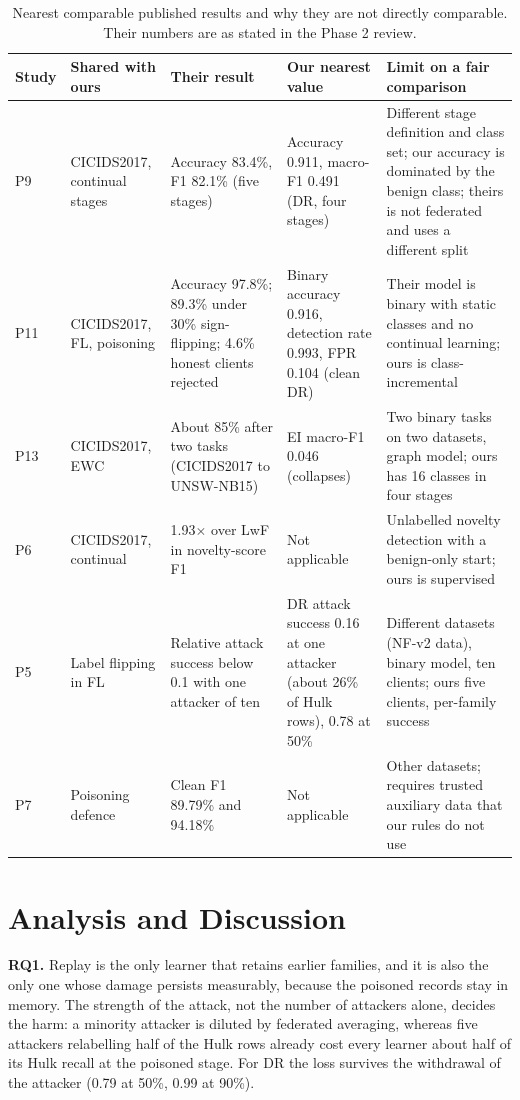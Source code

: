 \documentclass[10pt,a4paper]{article}
\begin{document}
\begin{table}[htbp]
\centering\footnotesize
\caption{Nearest comparable published results and why they are not directly comparable. Their numbers are as stated in the Phase 2 review.}
\label{tab:fair}
\begin{tabularx}{\linewidth}{L{1.5cm}L{2.2cm}L{3.3cm}L{3.0cm}Y}
\toprule
Study & Shared with ours & Their result & Our nearest value & Limit on a fair comparison\\
\midrule
P9 \cite{guo} & CICIDS2017, continual stages & Accuracy 83.4\%, F1 82.1\% (five stages) & Accuracy 0.911, macro-F1 0.491 (DR, four stages) & Different stage definition and class set; our accuracy is dominated by the benign class; theirs is not federated and uses a different split\\
P11 \cite{flzt} & CICIDS2017, FL, poisoning & Accuracy 97.8\%; 89.3\% under 30\% sign-flipping; 4.6\% honest clients rejected & Binary accuracy 0.916, detection rate 0.993, FPR 0.104 (clean DR) & Their model is binary with static classes and no continual learning; ours is class-incremental\\
P13 \cite{elgnn} & CICIDS2017, EWC & About 85\% after two tasks (CICIDS2017 to UNSW-NB15) & EI macro-F1 0.046 (collapses) & Two binary tasks on two datasets, graph model; ours has 16 classes in four stages\\
P6 \cite{cnd} & CICIDS2017, continual & 1.93$\times$ over LwF in novelty-score F1 & Not applicable & Unlabelled novelty detection with a benign-only start; ours is supervised\\
P5 \cite{lavaur} & Label flipping in FL & Relative attack success below 0.1 with one attacker of ten & DR attack success 0.16 at one attacker (about 26\% of Hulk rows), 0.78 at 50\% & Different datasets (NF-v2 data), binary model, ten clients; ours five clients, per-family success\\
P7 \cite{wei} & Poisoning defence & Clean F1 89.79\% and 94.18\% & Not applicable & Other datasets; requires trusted auxiliary data that our rules do not use\\
\bottomrule
\end{tabularx}
\end{table}

\section{Analysis and Discussion}\label{sec:disc}
\textbf{RQ1.} Replay is the only learner that retains earlier families, and it is also the only one whose damage persists measurably, because the poisoned records stay in memory. The strength of the attack, not the number of attackers alone, decides the harm: a minority attacker is diluted by federated averaging, whereas five attackers relabelling half of the Hulk rows already cost every learner about half of its Hulk recall at the poisoned stage. For DR the loss survives the withdrawal of the attacker (0.79 at 50\%, 0.99 at 90\%).
\end{document}
